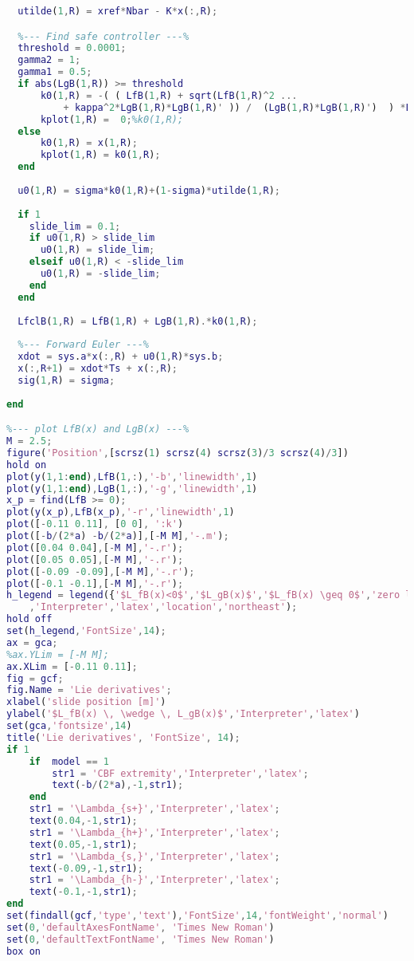 \begin{lstlisting}[language=matlab]
  %-- Find controller by pole placement --%
  utilde(1,R) = xref*Nbar - K*x(:,R);

  %--- Find safe controller ---%
  threshold = 0.0001;
  gamma2 = 1;
  gamma1 = 0.5;
  if abs(LgB(1,R)) >= threshold
      k0(1,R) = -( ( LfB(1,R) + sqrt(LfB(1,R)^2 ...
          + kappa^2*LgB(1,R)*LgB(1,R)' )) /  (LgB(1,R)*LgB(1,R)')  ) *LgB(1,R);
      kplot(1,R) =  0;%k0(1,R);
  else
      k0(1,R) = x(1,R);
      kplot(1,R) = k0(1,R);
  end 
  
  u0(1,R) = sigma*k0(1,R)+(1-sigma)*utilde(1,R);
  
  if 1
    slide_lim = 0.1;
    if u0(1,R) > slide_lim
      u0(1,R) = slide_lim;
    elseif u0(1,R) < -slide_lim
      u0(1,R) = -slide_lim;
    end
  end
  
  LfclB(1,R) = LfB(1,R) + LgB(1,R).*k0(1,R);
  
  %--- Forward Euler ---%
  xdot = sys.a*x(:,R) + u0(1,R)*sys.b;
  x(:,R+1) = xdot*Ts + x(:,R);
  sig(1,R) = sigma;
  
end

%--- plot LfB(x) and LgB(x) ---%
M = 2.5;
figure('Position',[scrsz(1) scrsz(4) scrsz(3)/3 scrsz(4)/3])
hold on
plot(y(1,1:end),LfB(1,:),'-b','linewidth',1)
plot(y(1,1:end),LgB(1,:),'-g','linewidth',1)
x_p = find(LfB >= 0);
plot(y(x_p),LfB(x_p),'-r','linewidth',1)
plot([-0.11 0.11], [0 0], ':k')
plot([-b/(2*a) -b/(2*a)],[-M M],'-.m');
plot([0.04 0.04],[-M M],'-.r');
plot([0.05 0.05],[-M M],'-.r');
plot([-0.09 -0.09],[-M M],'-.r');
plot([-0.1 -0.1],[-M M],'-.r');
h_legend = legend({'$L_fB(x)<0$','$L_gB(x)$','$L_fB(x) \geq 0$','zero level'}...
    ,'Interpreter','latex','location','northeast');
hold off
set(h_legend,'FontSize',14);
ax = gca;
%ax.YLim = [-M M];
ax.XLim = [-0.11 0.11];
fig = gcf;
fig.Name = 'Lie derivatives';
xlabel('slide position [m]')
ylabel('$L_fB(x) \, \wedge \, L_gB(x)$','Interpreter','latex')
set(gca,'fontsize',14)
title('Lie derivatives', 'FontSize', 14);
if 1
    if  model == 1
        str1 = 'CBF extremity','Interpreter','latex';
        text(-b/(2*a),-1,str1);
    end
    str1 = '\Lambda_{s+}','Interpreter','latex';
    text(0.04,-1,str1);
    str1 = '\Lambda_{h+}','Interpreter','latex';
    text(0.05,-1,str1);
    str1 = '\Lambda_{s,}','Interpreter','latex';
    text(-0.09,-1,str1); 
    str1 = '\Lambda_{h-}','Interpreter','latex';
    text(-0.1,-1,str1); 
end
set(findall(gcf,'type','text'),'FontSize',14,'fontWeight','normal')
set(0,'defaultAxesFontName', 'Times New Roman')
set(0,'defaultTextFontName', 'Times New Roman')
box on



\end{lstlisting}
